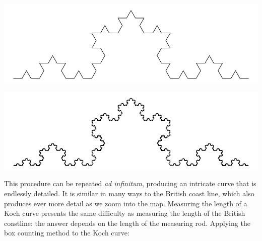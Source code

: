 \noindent\begin{minipage}[t][][b]{.5\textwidth}
  \includegraphics[width=\textwidth]{../figures/koch3.pdf}\medskip
\end{minipage}
\begin{minipage}[t][][t]{.5\textwidth}
  \label{fig:koch3}
\end{minipage}

\noindent\begin{minipage}[t][][b]{.5\textwidth}
  \includegraphics[width=\textwidth]{../figures/koch6.pdf}\medskip
\end{minipage}
\begin{minipage}[t][][t]{.5\textwidth}
  \label{fig:koch6}
\end{minipage}

This procedure can be repeated \emph{ad infinitum}, producing an
intricate curve that is endlessly detailed. It is similar in many ways
to the British coast line, which also produces ever more detail as we
zoom into the map. Measuring the length of a Koch curve presents the
same difficulty as measuring the length of the British coastline: the
answer depends on the length of the measuring rod. Applying the box
counting method to the Koch curve:\medskip

